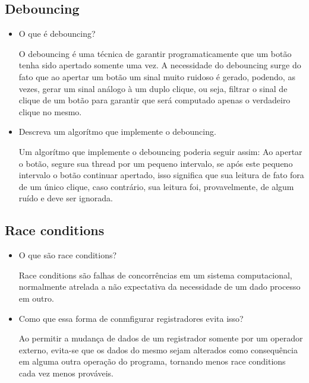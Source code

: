 \documentclass[11pt]{article}
\begin{document}
\subsection{Debouncing}
\label{sec:orgheadline8}
\begin{itemize}
\item O que é debouncing?

O debouncing é uma técnica de garantir programaticamente que um botão tenha sido apertado somente uma vez. A
necessidade do debouncing surge do fato que ao apertar um botão um sinal muito ruidoso é gerado, podendo, as
vezes, gerar um sinal análogo à um duplo clique, ou seja, filtrar o sinal de clique de um botão para garantir
que será computado apenas o verdadeiro clique no mesmo.

\item Descreva um algorítmo que implemente o debouncing.

Um algorítmo que implemente o debouncing poderia seguir assim:
Ao apertar o botão, segure sua thread por um pequeno intervalo, se após este pequeno intervalo o botão continuar
apertado, isso significa que sua leitura de fato fora de um único clique, caso contrário, sua leitura foi,
provavelmente, de algum ruído e deve ser ignorada.
\end{itemize}

\subsection{Race conditions}
\label{sec:orgheadline9}
\begin{itemize}
\item O que são race conditions?

Race conditions são falhas de concorrências em um sistema computacional, normalmente atrelada a não expectativa
da necessidade de um dado processo em outro.

\item Como que essa forma de conmfigurar registradores evita isso?

Ao permitir a mudança de dados de um registrador somente por um operador externo, evita-se que os dados do mesmo
sejam alterados como consequência em alguma outra operação do programa, tornando menos race conditions cada vez
menos prováveis.
\end{itemize}
\end{document}
